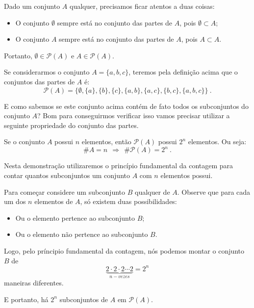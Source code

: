 Dado um conjunto $A$ qualquer, precisamos ficar atentos a duas coisas:
 \begin{itemize}
 \item O conjunto $\emptyset$ sempre está no conjunto das partes de $A$, pois $\emptyset \subset A$;
 \item O conjunto $A$ sempre está no conjunto das partes de $A$, pois $A \subset A$.
 \end{itemize}
 Portanto, $\emptyset \in \mathcal{P}(A)$ e $A \in \mathcal{P}(A)$.

 \begin{exem}
 Se considerarmos o conjunto $A= \{a, b, c\}$, teremos pela definição acima que o conjuntos das partes de $A$ é:
\begin{equation}
\mathcal{P}(A)= \{ \emptyset, \{a\}, \{b\}, \{c\}, \{a, b\}, \{a, c\}, \{b, c\}, \{a, b, c\} \} \ .
\end{equation}
 \end{exem}

 E como sabemos se este conjunto acima contém de fato todos os subconjuntos do conjunto $A$? Bom para conseguirmos verificar isso vamos precisar utilizar a seguinte propriedade do conjunto das partes.

 \begin{prop}
  Se o conjunto $A$ possui $n$ elementos, então $\mathcal{P}(A)$ possui $2^n$ elementos. Ou seja:
\begin{equation}
\# A= n \ \ \Rightarrow \ \ \# \mathcal{P}(A)= 2^n \ .
\end{equation}
\end{prop}

 \begin{dem}
 Nesta demonstração utilizaremos o princípio fundamental da contagem para contar quantos subconjuntos um conjunto $A$ com $n$ elementos possui.

 Para começar considere um subconjunto $B$ qualquer de $A$. Observe que para cada um dos $n$ elementos de $A$, só existem duas possibilidades:
 \begin{itemize}
 \item Ou o elemento pertence ao subconjunto $B$;
 \item Ou o elemento não pertence ao subconjunto $B$.
 \end{itemize}

 Logo, pelo príncipio fundamental da contagem, nós podemos montar o conjunto $B$ de
\begin{equation}
\underbrace{2 \cdot 2 \cdot 2 \cdots 2}_{n-vezes}= 2^n
\end{equation}
 maneiras diferentes.

 E portanto, há $2^n$ subconjuntos de $A$ em $\mathcal{P}(A)$.
 \end{dem}

